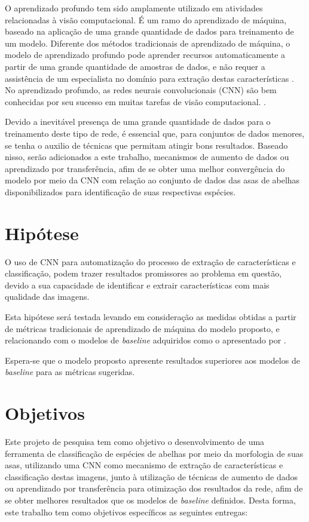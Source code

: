 \documentclass[
	12pt,				%
	oneside,			%
	a4paper,			%
	english,			%
	brazil				%
	]{abntex2ppgsi}
\begin{document}
O aprendizado profundo tem sido amplamente utilizado em atividades relacionadas à visão computacional. É um ramo do aprendizado de máquina, baseado na aplicação de uma grande quantidade de dados para treinamento de um modelo. Diferente dos métodos tradicionais de aprendizado de máquina, o modelo de aprendizado profundo pode aprender recursos automaticamente a partir de uma grande quantidade de amostras de dados, e não requer a assistência de um especialista no domínio para extração destas características \cite{liu2020classification}. No aprendizado profundo, as redes neurais convolucionais (CNN) são bem conhecidas por seu sucesso em muitas tarefas de visão computacional. \cite{le2020automated}.

Devido a inevitável presença de uma grande quantidade de dados para o treinamento deste tipo de rede, é essencial que, para conjuntos de dados menores, se tenha o auxilio de técnicas que permitam atingir bons resultados. Baseado nisso, serão adicionados a este trabalho, mecanismos de aumento de dados ou aprendizado por transferência, afim de se obter uma melhor convergência do modelo por meio da CNN com relação ao conjunto de dados das asas de abelhas disponibilizados para identificação de suas respectivas espécies.

\section{Hipótese}
O uso de CNN para automatização do processo de extração de características e classificação, podem trazer resultados promissores ao problema em questão, devido a sua capacidade de identificar e extrair características com mais qualidade das imagens.

Esta hipótese será testada levando em consideração as medidas obtidas a partir de métricas tradicionais de aprendizado de máquina do modelo proposto, e relacionando com o modelos de \textit{baseline} adquiridos como o apresentado por . 

Espera-se que o modelo proposto apresente resultados superiores aos modelos de \textit{baseline} para as métricas sugeridas.

\section{Objetivos}
Este projeto de pesquisa tem como objetivo o desenvolvimento de uma ferramenta de classificação de espécies de abelhas por meio da morfologia de suas asas, utilizando uma CNN como mecanismo de extração de características e classificação destas imagens, junto à utilização de técnicas de aumento de dados ou aprendizado por transferência para otimização dos resultados da rede, afim de se obter melhores resultados que os modelos de \textit{baseline} definidos. Desta forma, este trabalho tem como objetivos específicos as seguintes entregas:
\end{document}
